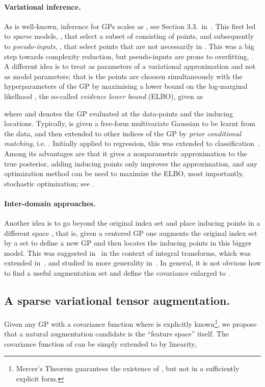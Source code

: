 \documentclass{article}
\begin{document}
    \paragraph{Variational inference.}
	As is well-known, inference for GPs scales as , see Section 3.3.~in~\cite{Rasmussen2006Gaussian}.
	This first led to \emph{sparse} models, \cite{quinonero2005unifying}, that select a subset  of  consisting of  points, and subsequently to \emph{pseudo-inputs}, \cite{snelson2006sparse}, that select points  that are not necessarily in .
	This was a big step towards complexity reduction, but pseudo-inputs are prone to overfitting, \cite{MatthewsDPhil}.
	A different idea is to treat  as parameters of a variational approximation \cite{Titsias2009Variational} and not as model parameters; that is the points  are choosen simultaneously with the hyperparameters of the GP by maximising a lower bound on the log-marginal likelhood , the so-called \emph{evidence lower bound} (ELBO), given as
	
	where  and  denotes the GP evaluated at the data-points and the inducing locations. Typically,  is given a free-form multivariate Gaussian to be learnt from the data, and then extended to other indices of the GP by \textit{prior conditional matching}, i.e. .	Initially applied to regression, this was extended to classification~\cite{chai2012variational, Hensman2015Scalable}.
	Among its advantages are that it gives a nonparametric approximation to the true posterior, adding inducing points only improves the approximation, and any optimization method can be used to maximize the ELBO, most importantly, stochastic optimization; see \cite{Hensman2013GaussianPF, bauer2016understanding,bui2016unifying}.
	

\paragraph{Inter-domain approaches.}Another idea is to go beyond the original index set and place inducing points  in a different space , that is, given a centered GP  one augments the original index set  by a set  to define a new GP  and then locates the inducing points in this bigger model.
	This was suggested in~\cite{lazaro2009inter} in the context of integral transforms, which was extended in~\cite{Hensman2016Fourier}, and studied in more generality in~\cite{matthews2016sparse}.
	In general, it is not obvious how to find a useful augmentation set  and define the covariance enlarged to .
  \subsection{A sparse variational tensor augmentation.}
	Given any GP with a covariance function  where  is explicitly known\footnote{Mercer's Theorem guarantees the existence of , but not in a sufficiently explicit form.}, we propose that a natural augmentation candidate is the ``feature space''  itself.
	The covariance function  of  can be simply extended to  by linearity,
  
\end{document}
